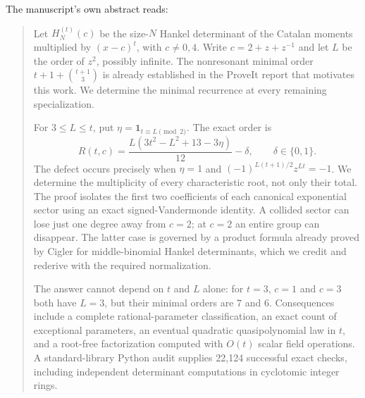 \documentclass[11pt,a4paper]{article}
\numberwithin{equation}{section}
\theoremstyle{definition}
\theoremstyle{remark}
\newcommand{\ind}{\mathbf 1}
\begin{document}
The manuscript's own abstract reads:
\begin{quote}\small
Let $H_N^{(t)}(c)$ be the size-$N$ Hankel determinant of the Catalan
moments multiplied by $(x-c)^t$, with $c\ne0,4$.  Write
$c=2+z+z^{-1}$ and let $L$ be the order of $z^2$, possibly infinite.
The nonresonant minimal order $t+1+\binom{t+1}{3}$ is already established
in the ProveIt report that motivates this work.  We determine the
minimal recurrence at every remaining specialization.

For $3\le L\le t$, put $\eta=\ind_{t\equiv L\pmod2}$.  The exact order is
\[
 \boxed{\qquad R(t,c)=\frac{L(3t^2-L^2+13-3\eta)}{12}-\delta,
                    \qquad \delta\in\{0,1\}.\qquad}
\]
The defect occurs precisely when $\eta=1$ and
$(-1)^{L(t+1)/2}z^{Lt}=-1$.  We determine the multiplicity of every
characteristic root, not only their total.  The proof isolates the
first two coefficients of each canonical exponential sector using an
exact signed-Vandermonde identity.  A collided sector can lose just
one degree away from $c=2$; at $c=2$ an entire group can disappear.
The latter case is governed by a product formula already proved by
Cigler for middle-binomial Hankel determinants, which we credit and
rederive with the required normalization.

The answer cannot depend on $t$ and $L$ alone: for $t=3$, $c=1$ and
$c=3$ both have $L=3$, but their minimal orders are $7$ and $6$.
Consequences include a complete rational-parameter classification,
an exact count of exceptional parameters, an eventual quadratic
quasipolynomial law in $t$, and a root-free factorization computed with
$O(t)$ scalar field operations.  A standard-library Python audit supplies
22,124 successful exact checks, including independent determinant
computations in cyclotomic integer rings.
\end{quote}
\end{document}
